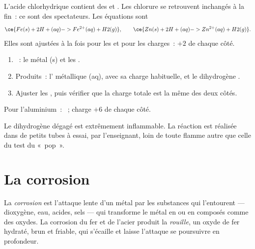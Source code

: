 \begin{example}\label{ex:g9:metals-acids-corrosion:iron}
L'acide chlorhydrique contient des   et . Les
 chlorure se retrouvent inchangés à la fin~: ce sont des
spectateurs. Les équations sont
\[
  \ce{Fe(s) + 2H+(aq) -> Fe^{2+}(aq) + H2(g)}, \qquad
  \ce{Zn(s) + 2H+(aq) -> Zn^{2+}(aq) + H2(g)}.
\]
Elles sont ajustées à la fois pour les  et pour les charges~:
$+2$ de chaque côté.
\end{example}

\begin{method}\label{met:g9:metals-acids-corrosion:write}
\begin{enumerate}
  \item {}~: le métal (s) et les  .
  \item Produits~: l' métallique (aq), avec sa charge habituelle, et
        le dihydrogène .
  \item Ajuster les , puis vérifier que la charge totale est la
        même des deux côtés.
\end{enumerate}
Pour l'aluminium~: ~;
charge $+6$ de chaque côté.
\end{method}

\begin{safety}{}
Le dihydrogène dégagé est extrêmement inflammable. La réaction est
réalisée dans de petits tubes à essai, par l'enseignant, loin de toute
flamme autre que celle du test du «~pop~».
\end{safety}

\section{La corrosion}

\begin{definition}\label{def:g9:metals-acids-corrosion:corrosion}
La \emph{corrosion} est l'attaque lente d'un métal par
les substances qui l'entourent --- dioxygène, eau, acides, sels --- qui
transforme le métal en  ou en composés comme des oxydes. La corrosion
du fer et de l'acier produit la \emph{rouille}, un oxyde
de fer hydraté, brun et friable, qui s'écaille et laisse l'attaque se
poursuivre en profondeur.
\end{definition}

